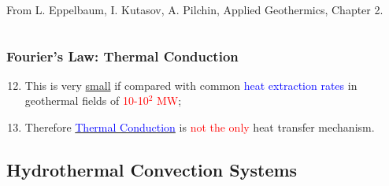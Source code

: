 \documentclass[10pt,compress]{beamer}
\newcommand{\red}{\textcolor{red}}
\newcommand{\blue}{\textcolor{blue}}
\begin{document}
\begin{frame}
\begin{columns}
\begin{column}[c]{0.55\linewidth}
{          \scriptsize From L. Eppelbaum, I. Kutasov, A. Pilchin, Applied Geothermics, Chapter 2.}
    \end{column}  
  \end{columns}
\end{frame} 

\begin{frame}
 \frametitle{Fourier's Law: Thermal Conduction}
    \begin{enumerate}[1.]\setcounter{enumi}{11} \scriptsize
       \item <1-> This is very \underline{small} if compared with common \blue{heat extraction rates} in geothermal fields of \red{10-10$^{2}$ MW};
       \item <2-> Therefore \underline{\blue{Thermal Conduction}} is \red{not the only} heat transfer mechanism.
    \end{enumerate}

\end{frame}




\subsection{Hydrothermal Convection Systems}
\end{document}
